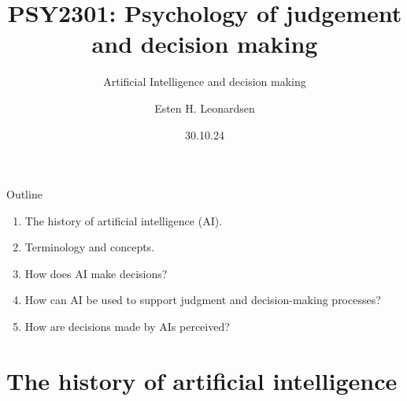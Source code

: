 \documentclass[8pt]{beamer}
\date{30.10.24}
\title{PSY2301: Psychology of judgement and decision making}
\subtitle{Artificial Intelligence and decision making}
\author{Esten H. Leonardsen}
\begin{document}

	\begin{frame}
		\maketitle
	\end{frame}

	\begin{frame}{Outline}
		\begin{enumerate}
			\item The history of artificial intelligence (AI).
			\item Terminology and concepts.
			\item How does AI make decisions?
			\item How can AI be used to support judgment and decision-making processes?
			\item How are decisions made by AIs perceived?
		\end{enumerate}
	\end{frame}


	\section{The history of artificial intelligence}
\end{document}
